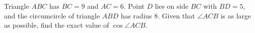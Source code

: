 Triangle $ABC$ has $BC=9$ and $AC=6$. Point $D$ lies on side $BC$ with $BD=5$, and the circumcircle of triangle $ABD$ has radius $8$. Given that $\angle ACB$ is as large as possible, find the exact value of $\cos\angle ACB$.
